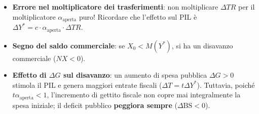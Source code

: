 \begin{esame}
\begin{itemize}
    \item \textbf{Errore nel moltiplicatore dei trasferimenti}: non moltiplicare $\Delta TR$ per il moltiplicatore $\alpha_{\text{aperta}}$ puro! Ricordare che l'effetto sul PIL è $\Delta Y^* = c \cdot \alpha_{\text{aperta}} \cdot \Delta TR$.
    \item \textbf{Segno del saldo commerciale}: se $X_0 < M(Y^*)$, si ha un disavanzo commerciale ($NX < 0$).
    \item \textbf{Effetto di $\Delta G$ sul disavanzo}: un aumento di spesa pubblica $\Delta G > 0$ stimola il PIL e genera maggiori entrate fiscali ($\Delta T = t \Delta Y^*$). Tuttavia, poiché $t \alpha_{\text{aperta}} < 1$, l'incremento di gettito fiscale non copre mai integralmente la spesa iniziale; il deficit pubblico \textbf{peggiora sempre} ($\Delta \mathrm{BS} < 0$).
\end{itemize}
\end{esame}

